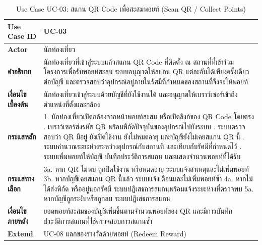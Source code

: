 \begin{table}[H]
\centering
\caption{Use Case UC-03: สแกน QR Code เพื่อสะสมพอยท์ (Scan QR / Collect Points)}
\label{tab:uc03}
\begin{tabular}{|p{3.2cm}|p{10cm}|}
\hline
\textbf{Use Case ID} & UC-03 \\ \hline
\textbf{Actor} & นักท่องเที่ยว \\ \hline
\textbf{คำอธิบาย} & นักท่องเที่ยวที่เข้าสู่ระบบแล้วสแกน QR Code ที่ติดตั้ง ณ สถานที่ที่เข้าร่วมโครงการเพื่อรับพอยท์สะสม ระบบอนุญาตให้สแกน QR แต่ละอันได้เพียงครั้งเดียวต่อบัญชี และตรวจสอบว่าอุปกรณ์อยู่ภายในรัศมีที่กำหนดของสถานที่จึงจะให้พอยท์ \\ \hline
\textbf{เงื่อนไขเบื้องต้น} & นักท่องเที่ยวเข้าสู่ระบบด้วยบัญชีที่ยังใช้งานได้ และอนุญาตให้เบราว์เซอร์เข้าถึงตำแหน่งที่ตั้งและกล้อง \\ \hline
\textbf{กระแสหลัก} & 1. นักท่องเที่ยวเปิดกล้องจากหน้าพอยท์สะสม หรือเปิดลิงก์ของ QR Code โดยตรง \newline 2. เบราว์เซอร์ส่งรหัส QR พร้อมพิกัดปัจจุบันของอุปกรณ์ไปยังระบบ \newline 3. ระบบตรวจสอบว่า QR มีอยู่ ยังเปิดใช้งาน ยังไม่หมดอายุ และบัญชียังไม่เคยสแกน QR นี้ \newline 4. ระบบคำนวณระยะห่างระหว่างอุปกรณ์กับสถานที่ และเทียบกับรัศมีที่กำหนดไว้ \newline 5. ระบบเพิ่มพอยท์ให้บัญชี บันทึกประวัติการสแกน และแสดงจำนวนพอยท์ที่ได้รับ \\ \hline
\textbf{กระแสทางเลือก} & 3a. หาก QR ไม่พบ ถูกปิดใช้งาน หรือหมดอายุ ระบบแจ้งสาเหตุและไม่เพิ่มพอยท์ \newline 3b. หากบัญชีเคยสแกน QR นี้แล้ว ระบบแจ้งเตือนและไม่เพิ่มพอยท์ซ้ำ \newline 4a. หากไม่ได้ส่งพิกัด หรืออยู่นอกรัศมี ระบบปฏิเสธการสแกนพร้อมแจ้งระยะห่างที่ตรวจพบ \newline 5a. หากบัญชีถูกระงับหรือถูกลบ ระบบปฏิเสธการสแกน \\ \hline
\textbf{เงื่อนไขภายหลัง} & ยอดพอยท์สะสมของบัญชีเพิ่มขึ้นตามจำนวนพอยท์ของ QR และมีการบันทึกประวัติการสแกนที่ใช้ตรวจสอบการสแกนซ้ำ \\ \hline
\textbf{Extend} & UC-08 แลกของรางวัลด้วยพอยท์ (Redeem Reward) \\
\hline
\end{tabular}
\end{table}

